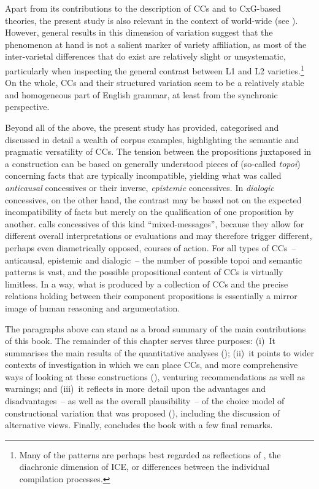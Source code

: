 Apart from its contributions to the description of CCs and to CxG-based theories, the present study is also relevant in the context of  world-wide (see ). However, general results in this dimension of variation suggest that the phenomenon at hand is not a salient marker of variety affiliation, as most of the inter-varietal differences that do exist are relatively slight or unsystematic, particularly when inspecting the general contrast between L1 and L2 varieties.\footnote{Many of the patterns are perhaps best regarded as reflections of , the diachronic dimension of ICE, or differences between the individual compilation processes.} On the whole, CCs and their structured variation seem to be a relatively stable and homogeneous part of English grammar, at least from the synchronic perspective.

Beyond all of the above, the present study has provided, categorised and discussed in detail a wealth of corpus examples, highlighting the semantic and pragmatic versatility of CCs. The tension between the propositions juxtaposed in a construction can be based on generally understood pieces of  (so-called \textit{topoi}) concerning facts that are typically incompatible, yielding what was called \textit{anticausal} concessives or their inverse, \textit{epistemic} concessives. In \textit{dialogic} concessives, on the other hand, the contrast may be based not on the expected incompatibility of facts but merely on the qualification of one proposition by another. \citet[166]{Hilpert2013a} calls concessives of this kind “mixed-messages”, because they allow for different overall interpretations or evaluations and may therefore trigger different, perhaps even diametrically opposed, courses of action. For all types of CCs~– anticausal, epistemic and dialogic~– the number of possible topoi and semantic patterns is vast, and the possible propositional content of CCs is virtually limitless. In a way, what is produced by a collection of CCs and the precise relations holding between their component propositions is essentially a mirror image of human reasoning and argumentation.

The paragraphs above can stand as a broad summary of the main contributions of this book. The remainder of this chapter serves three purposes:
(i)~It summarises the main results of the quantitative analyses ();
(ii)~it points to wider contexts of investigation in which we can place CCs, and more comprehensive ways of looking at these constructions (), venturing recommendations as well as warnings; and
(iii)~it reflects in more detail upon the advantages and disadvantages~– as well as the overall plausibility~– of the choice model of constructional variation that was proposed (), including the discussion of alternative views. Finally,  concludes the book with a few final remarks.

